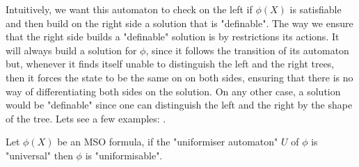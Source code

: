 \documentclass[a4paper,UKenglish,cleveref, autoref, thm-restate]{lipics-v2021}
\begin{document}
Intuitively, we want this automaton to check on the left if $\phi(X)$ is satisfiable and then build on the right side a
solution that is "definable". The way we ensure that the right side builds a "definable" solution is by restrictions its actions.
It will always build a solution for $\phi$, since it follows the transition of its automaton but, whenever it finds itself unable to
distinguish the left and the right trees, then it forces the state to be the same on on both sides, ensuring that there is no way of differentiating both sides on the
solution. On any other case, a solution would be "definable" since one can distinguish the left and the right by the shape of the tree.
Lets see a few examples: 
.

\begin{lemma}
	Let $\phi(X)$ be an MSO formula, if the "uniformiser automaton" $U$ of $\phi$ is "universal" then $\phi$ is "uniformisable".
\end{lemma}
\end{document}
